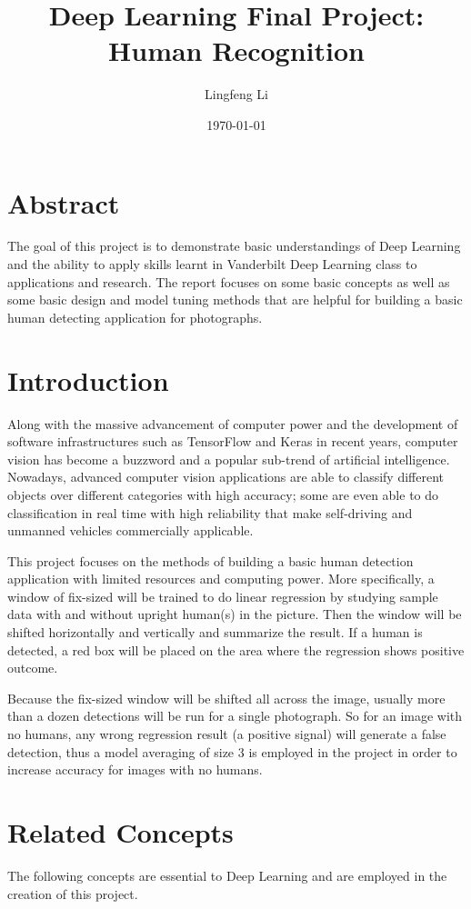 \documentclass[twocolumn, 12pt]{article}
\begin{document}
\title{Deep Learning Final Project: Human Recognition}
\author{Lingfeng Li}
\date{\today}
\maketitle
\newpage
{}
\section*{Abstract}
The goal of this project is to demonstrate basic understandings of Deep Learning and the ability to apply skills learnt in Vanderbilt Deep Learning class to applications and research. The report focuses on some basic concepts as well as some basic design and model tuning methods that are helpful for building a basic human detecting application for photographs. 
	
\section{Introduction}
Along with the massive advancement of computer power and the development of software infrastructures such as TensorFlow and Keras in recent years, computer vision has become a buzzword and a popular sub-trend of artificial intelligence. Nowadays, advanced computer vision applications are able to classify different objects over different categories with high accuracy; some are even able to do classification in real time with high reliability that make self-driving and unmanned vehicles commercially applicable. 

This project focuses on the methods of building a basic human detection application with limited resources and computing power. More specifically, a window of fix-sized will be trained to do linear regression by studying sample data with and without upright human(s) in the picture. Then the window will be shifted horizontally and vertically and summarize the result. If a human is detected, a red box will be placed on the area where the regression shows positive outcome. 

Because the fix-sized window will be shifted all across the image, usually more than a dozen detections will be run for a single photograph. So for an image with no humans, any wrong regression result (a positive signal) will generate a false detection, thus a model averaging of size 3 is employed in the project in order to increase accuracy for images with no humans. 

\section{Related Concepts}
The following concepts are essential to Deep Learning and are employed in the creation of this project.
\end{document}
